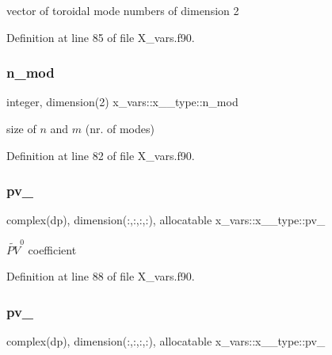 vector of toroidal mode numbers of dimension 2 



Definition at line 85 of file X\+\_\+vars.\+f90.

\mbox{\label{structx__vars_1_1x__2__type_a87efa10d03a1570fca946a56f7af7b25}} 
\subsubsection{\texorpdfstring{n\+\_\+mod}{n\_mod}}
{\footnotesize\ttfamily integer, dimension(2) x\+\_\+vars\+::x\+\_\+\_\+type\+::n\+\_\+mod}



size of $n$ and $m$ (nr. of modes) 



Definition at line 82 of file X\+\_\+vars.\+f90.

\mbox{\label{structx__vars_1_1x__2__type_a5b7c4fa433fe46dabc806a7fbb1832dc}} 
\subsubsection{\texorpdfstring{pv\+\_}{pv\_0}}
{\footnotesize\ttfamily complex(dp), dimension(\+:,\+:,\+:,\+:), allocatable x\+\_\+vars\+::x\+\_\+\_\+type\+::pv\+\_}



$\widetilde{PV}^0$ coefficient 



Definition at line 88 of file X\+\_\+vars.\+f90.

\mbox{\label{structx__vars_1_1x__2__type_a53910430e36de0ca91359322bdcf1e86}} 
\subsubsection{\texorpdfstring{pv\+\_}{pv\_1}}
{\footnotesize\ttfamily complex(dp), dimension(\+:,\+:,\+:,\+:), allocatable x\+\_\+vars\+::x\+\_\+\_\+type\+::pv\+\_}



